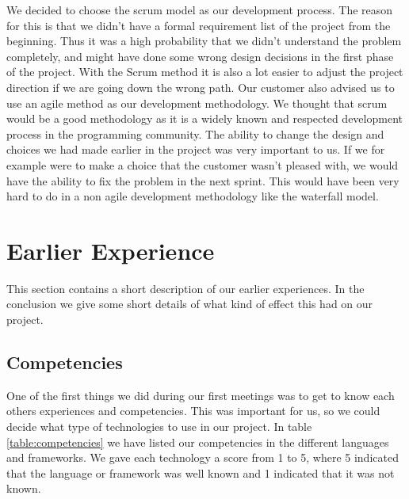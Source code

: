 We decided to choose the scrum model as our development process. 
The reason for this is that we didn't have a formal requirement list of the project from the beginning.
Thus it was a high probability that we didn't understand the problem completely, and might have done some wrong design decisions in the first phase of the project. 
With the Scrum method it is also a lot easier to adjust the project direction if we are going down the wrong path.
Our customer also advised us to use an agile method as our development methodology.
We thought that scrum would be a good methodology as it is a widely known and respected development process in the programming community.
The ability to change the design and choices we had made earlier in the project was very important to us.
If we for example were to make a choice that the customer wasn't pleased with, we would have the ability to fix the problem in the next sprint.
This would have been very hard to do in a non agile development methodology like the waterfall model.


\section{Earlier Experience}

This section contains a short description of our earlier experiences.
In the conclusion we give some short details of what kind of effect this had on our project.

\subsection{Competencies}

One of the first things we did during our first meetings was to get to know each others experiences and competencies.
This was important for us, so we could decide what type of technologies to use in our project.
In table \ref{table:competencies} we have listed our competencies in the different languages and frameworks.
We gave each technology a score from 1 to 5, where 5 indicated that the language or framework was well known and 1 indicated that it was not known.

